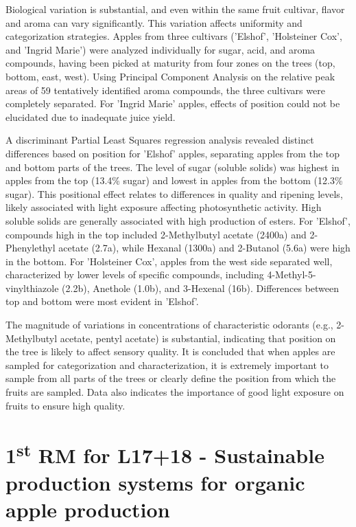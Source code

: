 \vspace{0.5em}
Biological variation is substantial, and even within the same fruit cultivar, flavor and aroma can vary significantly. This variation affects uniformity and categorization strategies. Apples from three cultivars ('Elshof', 'Holsteiner Cox', and 'Ingrid Marie') were analyzed individually for sugar, acid, and aroma compounds, having been picked at maturity from four zones on the trees (top, bottom, east, west). Using Principal Component Analysis on the relative peak areas of 59 tentatively identified aroma compounds, the three cultivars were completely separated. For 'Ingrid Marie' apples, effects of position could not be elucidated due to inadequate juice yield.

\vspace{0.5em}
A discriminant Partial Least Squares regression analysis revealed distinct differences based on position for 'Elshof' apples, separating apples from the top and bottom parts of the trees. The level of sugar (soluble solids) was highest in apples from the top (13.4\% sugar) and lowest in apples from the bottom (12.3\% sugar). This positional effect relates to differences in quality and ripening levels, likely associated with light exposure affecting photosynthetic activity. High soluble solids are generally associated with high production of esters. For 'Elshof', compounds high in the top included 2-Methylbutyl acetate (2400a) and 2-Phenylethyl acetate (2.7a), while Hexanal (1300a) and 2-Butanol (5.6a) were high in the bottom. For 'Holsteiner Cox', apples from the west side separated well, characterized by lower levels of specific compounds, including 4-Methyl-5-vinylthiazole (2.2b), Anethole (1.0b), and 3-Hexenal (16b). Differences between top and bottom were most evident in 'Elshof'.

\vspace{0.5em}
The magnitude of variations in concentrations of characteristic odorants (e.g., 2-Methylbutyl acetate, pentyl acetate) is substantial, indicating that position on the tree is likely to affect sensory quality. It is concluded that when apples are sampled for categorization and characterization, it is extremely important to sample from all parts of the trees or clearly define the position from which the fruits are sampled. Data also indicates the importance of good light exposure on fruits to ensure high quality.


\section{\texorpdfstring{1\textsuperscript{st} RM for L17+18 - Sustainable production systems for organic apple production}{1st RM for L17+18 - Sustainable production systems for organic apple production}}

